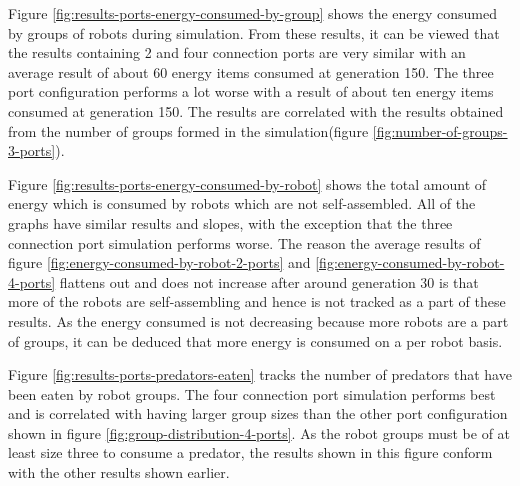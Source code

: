Figure \ref{fig:results-ports-energy-consumed-by-group} shows the energy consumed by groups of robots during simulation.
From these results, it can be viewed that the results containing 2 and four connection ports are very similar with an average result of about 60 energy items consumed at generation 150.
The three port configuration performs a lot worse with a result of about ten energy items consumed at generation 150.
The results are correlated with the results obtained from the number of groups formed in the simulation(figure \ref{fig:number-of-groups-3-ports}).


\vspace*{\fill}
\newpage
\vspace*{\fill}



Figure \ref{fig:results-ports-energy-consumed-by-robot} shows the total amount of energy which is consumed by robots which are not self-assembled.
All of the graphs have similar results and slopes, with the exception that the three connection port simulation performs worse.
The reason the average results of figure \ref{fig:energy-consumed-by-robot-2-ports} and \ref{fig:energy-consumed-by-robot-4-ports} flattens out and does not increase after around generation 30 is that more of the robots are self-assembling and hence is not tracked as a part of these results.
As the energy consumed is not decreasing because more robots are a part of groups, it can be deduced that more energy is consumed on a per robot basis.

\vspace*{\fill}
\newpage
\vspace*{\fill}



Figure \ref{fig:results-ports-predators-eaten} tracks the number of predators that have been eaten by robot groups. 
The four connection port simulation performs best and is correlated with having larger group sizes than the other port configuration shown in figure \ref{fig:group-distribution-4-ports}.
As the robot groups must be of at least size three to consume a predator, the results shown in this figure conform with the other results shown earlier.

\vspace*{\fill}
